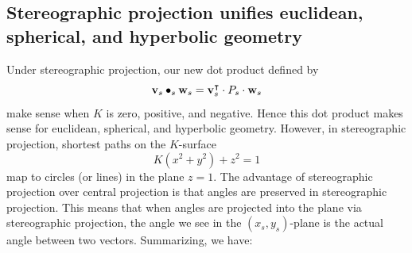 \documentclass[newpage,hints,12pt,noauthor,nooutcomes]{ximera}
\begin{document}
\subsection{Stereographic projection unifies euclidean, spherical, and hyperbolic geometry}


Under stereographic projection, our new dot product defined by
\[
\mathbf{v}_s\bullet_s \mathbf{w}_s = \mathbf{v}_s^\intercal \cdot P_s \cdot \mathbf{w}_s
\]
make sense when $K$ is zero, positive, and negative. Hence this dot
product makes sense for euclidean, spherical, and hyperbolic
geometry. However, in stereographic projection, shortest paths on the
$K$-surface
\[
K(x^2 + y^2) + z^2 = 1
\]
map to circles (or lines) in the plane $z=1$. The advantage of
stereographic projection over central projection is that angles are
preserved in stereographic projection. This means that when angles are
projected into the plane via stereographic projection, the angle we
see in the $(x_s,y_s)$-plane is the actual angle between two
vectors. Summarizing, we have:
\end{document}
